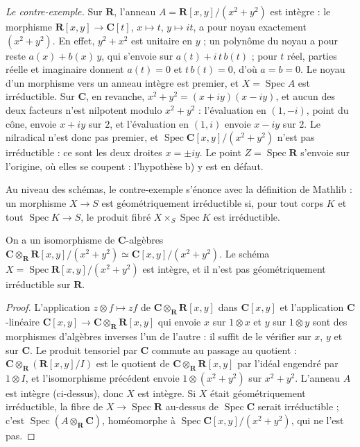 \noindent\emph{Le contre-exemple.} Sur $\mathbf R$, l'anneau $A = \mathbf R[x,y]/(x^2 + y^2)$ est intègre : le morphisme $\mathbf R[x,y] \to \mathbf C[t]$, $x \mapsto t$, $y \mapsto i t$, a pour noyau exactement $(x^2 + y^2)$. En effet, $y^2 + x^2$ est unitaire en $y$ ; un polynôme du noyau a pour reste $a(x) + b(x)\,y$, qui s'envoie sur $a(t) + i\,t\,b(t)$ ; pour $t$ réel, parties réelle et imaginaire donnent $a(t) = 0$ et $t\,b(t) = 0$, d'où $a = b = 0$. Le noyau d'un morphisme vers un anneau intègre est premier, et $X = \operatorname{Spec} A$ est irréductible. Sur $\mathbf C$, en revanche, $x^2 + y^2 = (x + iy)(x - iy)$, et aucun des deux facteurs n'est nilpotent modulo $x^2 + y^2$ : l'évaluation en $(1, -i)$, point du cône, envoie $x + iy$ sur $2$, et l'évaluation en $(1, i)$ envoie $x - iy$ sur $2$. Le nilradical n'est donc pas premier, et $\operatorname{Spec} \mathbf C[x,y]/(x^2 + y^2)$ n'est pas irréductible : ce sont les deux droites $x = \pm i y$. Le point $Z = \operatorname{Spec} \mathbf R$ s'envoie sur l'origine, où elles se coupent : l'hypothèse b) y est en défaut.

Au niveau des schémas, le contre-exemple s'énonce avec la définition de Mathlib : un morphisme $X \to S$ est géométriquement irréductible si, pour tout corps $K$ et tout $\operatorname{Spec} K \to S$, le produit fibré $X \times_S \operatorname{Spec} K$ est irréductible.

\begin{encadre}
\begin{enonce}
On a un isomorphisme de $\mathbf C$-algèbres $\mathbf C \otimes_{\mathbf R} \mathbf R[x,y]/(x^2 + y^2) \simeq \mathbf C[x,y]/(x^2 + y^2)$. Le schéma $X = \operatorname{Spec} \mathbf R[x,y]/(x^2 + y^2)$ est intègre, et il n'est pas géométriquement irréductible sur $\mathbf R$.
\end{enonce}
\end{encadre}

\begin{proof}
L'application $z \otimes f \mapsto z f$ de $\mathbf C \otimes_{\mathbf R} \mathbf R[x,y]$ dans $\mathbf C[x,y]$ et l'application $\mathbf C$-linéaire $\mathbf C[x,y] \to \mathbf C \otimes_{\mathbf R} \mathbf R[x,y]$ qui envoie $x$ sur $1 \otimes x$ et $y$ sur $1 \otimes y$ sont des morphismes d'algèbres inverses l'un de l'autre : il suffit de le vérifier sur $x$, $y$ et sur $\mathbf C$. Le produit tensoriel par $\mathbf C$ commute au passage au quotient : $\mathbf C \otimes_{\mathbf R} (\mathbf R[x,y]/I)$ est le quotient de $\mathbf C \otimes_{\mathbf R} \mathbf R[x,y]$ par l'idéal engendré par $1 \otimes I$, et l'isomorphisme précédent envoie $1 \otimes (x^2 + y^2)$ sur $x^2 + y^2$. L'anneau $A$ est intègre (ci-dessus), donc $X$ est intègre. Si $X$ était géométriquement irréductible, la fibre de $X \to \operatorname{Spec} \mathbf R$ au-dessus de $\operatorname{Spec} \mathbf C$ serait irréductible ; c'est $\operatorname{Spec}(A \otimes_{\mathbf R} \mathbf C)$, homéomorphe à $\operatorname{Spec} \mathbf C[x,y]/(x^2 + y^2)$, qui ne l'est pas.
\end{proof}

